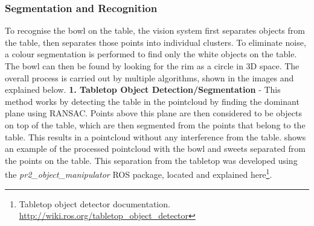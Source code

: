 \subsubsection{Segmentation and Recognition}
To recognise the bowl on the table, the vision system first separates objects from the table, then separates those points into individual clusters. To eliminate noise, a colour segmentation is performed to find only the white objects on the table. The bowl can then be found by looking for the rim as a circle in 3D space. The overall process is carried out by multiple algorithms, shown in the images and explained below.
\newline\newline
\textbf{1. Tabletop Object Detection/Segmentation} - 
This method works by detecting the table in the pointcloud by finding the dominant plane using RANSAC. Points above this plane are then considered to be objects on top of the table, which are then segmented from the points that belong to the table. This results in a pointcloud without any interference from the table. \textbf{} shows an example of the processed pointcloud with the bowl and sweets separated from the points on the table. This separation from the tabletop was developed using the \textit{pr2\_object\_manipulator} ROS package, located and explained here\footnote{Tabletop object detector documentation. \url{http://wiki.ros.org/tabletop_object_detector}}.
